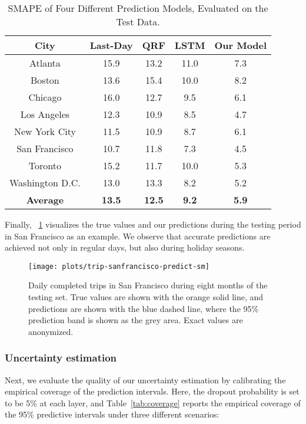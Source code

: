 \documentclass[conference,compsoc,final]{IEEEtran}
\begin{document}
\begin{table}[!t]
\renewcommand{\arraystretch}{1.3}
\caption{SMAPE of Four Different Prediction Models, Evaluated on the Test Data.}
\label{tab:prediction}
\centering
\begin{tabular}{| c | c | c | c | c |}
\hline
{\bf City} & {\bf Last-Day} & {\bf QRF} & {\bf LSTM} & {\bf Our Model}\\
\hline
Atlanta & 15.9 & 13.2  & 11.0 & 7.3 \\
\hline
Boston & 13.6 & 15.4 & 10.0 & 8.2 \\
\hline
Chicago & 16.0 & 12.7 & 9.5 & 6.1 \\
\hline
Los Angeles & 12.3 & 10.9 & 8.5 & 4.7 \\
\hline
New York City & 11.5 & 10.9 & 8.7 & 6.1 \\
\hline
San Francisco & 10.7 & 11.8 & 7.3 & 4.5 \\
\hline
Toronto & 15.2 & 11.7 & 10.0 & 5.3 \\
\hline
Washington D.C. & 13.0 & 13.3 & 8.2 & 5.2 \\
\hline
{\bf Average} & {\bf 13.5} & {\bf 12.5} & {\bf 9.2} &  {\bf 5.9} \\
\hline
\end{tabular}
\end{table}

Finally, \figurename~\ref{fig:sf-prediction} visualizes the true values and our predictions during the testing period in San Francisco as an example. We observe that accurate predictions are achieved not only in regular days, but also during holiday seasons.

\begin{figure}[!t]
\centering
\texttt{[image: plots/trip-sanfrancisco-predict-sm]}
\caption{Daily completed trips in San Francisco during eight months of the testing set. True values are shown with the orange solid line, and predictions are shown with the blue dashed line, where the 95\% prediction band is shown as the grey area. Exact values are anonymized. }
\label{fig:sf-prediction}
\end{figure}




\subsubsection{Uncertainty estimation}
Next, we evaluate the quality of our uncertainty estimation by calibrating the empirical coverage of the prediction intervals. Here, the dropout probability is set to be 5\% at each layer, and Table~\ref{tab:coverage} reports the empirical coverage of the 95\% predictive intervals under three different scenarios: 
\end{document}
